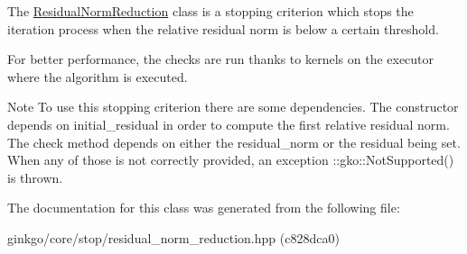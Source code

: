 The \hyperlink{classgko_1_1stop_1_1ResidualNormReduction}{Residual\+Norm\+Reduction} class is a stopping criterion which stops the iteration process when the relative residual norm is below a certain threshold. 

For better performance, the checks are run thanks to kernels on the executor where the algorithm is executed.

\begin{DoxyNote}{Note}
To use this stopping criterion there are some dependencies. The constructor depends on {\ttfamily initial\+\_\+residual} in order to compute the first relative residual norm. The check method depends on either the {\ttfamily residual\+\_\+norm} or the {\ttfamily residual} being set. When any of those is not correctly provided, an exception \+::gko\+::\+Not\+Supported() is thrown. 
\end{DoxyNote}


The documentation for this class was generated from the following file\+:\begin{DoxyCompactItemize}
\item 
ginkgo/core/stop/residual\+\_\+norm\+\_\+reduction.\+hpp (c828dca0)\end{DoxyCompactItemize}
